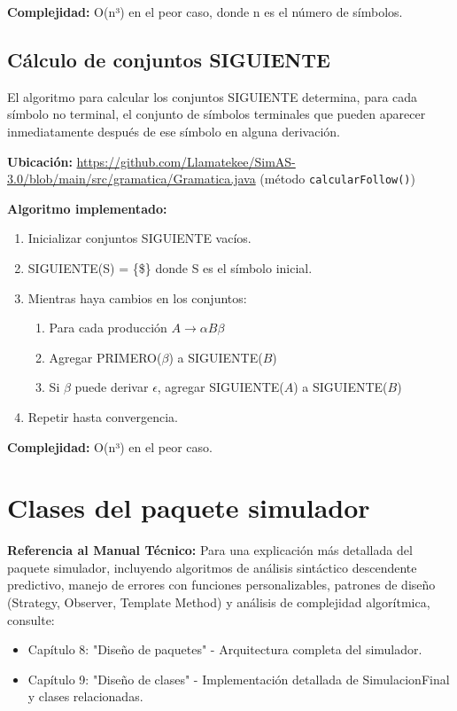 \textbf{Complejidad:} O(n³) en el peor caso, donde n es el número de símbolos.

\subsection{Cálculo de conjuntos SIGUIENTE}

El algoritmo para calcular los conjuntos SIGUIENTE determina, para cada símbolo no terminal, el conjunto de símbolos terminales que pueden aparecer inmediatamente después de ese símbolo en alguna derivación.

\textbf{Ubicación:} \url{https://github.com/Llamatekee/SimAS-3.0/blob/main/src/gramatica/Gramatica.java} (método \texttt{calcularFollow()})

\textbf{Algoritmo implementado:}
\begin{enumerate}
    \item Inicializar conjuntos SIGUIENTE vacíos.
    \item SIGUIENTE(S) = \{\$\} donde S es el símbolo inicial.
    \item Mientras haya cambios en los conjuntos:
    \begin{enumerate}
        \item Para cada producción $A \rightarrow \alpha B \beta$
        \item Agregar PRIMERO($\beta$) a SIGUIENTE($B$)
        \item Si $\beta$ puede derivar $\epsilon$, agregar SIGUIENTE($A$) a SIGUIENTE($B$)
    \end{enumerate}
    \item Repetir hasta convergencia.
\end{enumerate}

\textbf{Complejidad:} O(n³) en el peor caso.

\section{Clases del paquete simulador}

\textbf{Referencia al Manual Técnico:} Para una explicación más detallada del paquete simulador, incluyendo algoritmos de análisis sintáctico descendente predictivo, manejo de errores con funciones personalizables, patrones de diseño (Strategy, Observer, Template Method) y análisis de complejidad algorítmica, consulte:
\begin{itemize}
    \item Capítulo 8: "Diseño de paquetes" - Arquitectura completa del simulador.
    \item Capítulo 9: "Diseño de clases" - Implementación detallada de SimulacionFinal y clases relacionadas.
\end{itemize}


